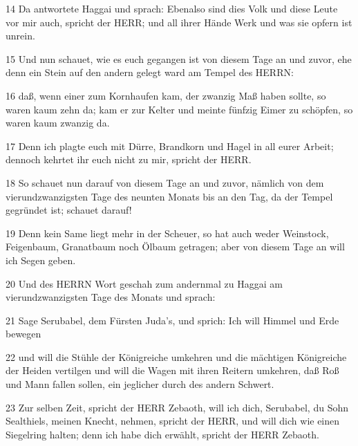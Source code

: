 \par 14 Da antwortete Haggai und sprach: Ebenalso sind dies Volk und diese Leute vor mir auch, spricht der HERR; und all ihrer Hände Werk und was sie opfern ist unrein.
\par 15 Und nun schauet, wie es euch gegangen ist von diesem Tage an und zuvor, ehe denn ein Stein auf den andern gelegt ward am Tempel des HERRN:
\par 16 daß, wenn einer zum Kornhaufen kam, der zwanzig Maß haben sollte, so waren kaum zehn da; kam er zur Kelter und meinte fünfzig Eimer zu schöpfen, so waren kaum zwanzig da.
\par 17 Denn ich plagte euch mit Dürre, Brandkorn und Hagel in all eurer Arbeit; dennoch kehrtet ihr euch nicht zu mir, spricht der HERR.
\par 18 So schauet nun darauf von diesem Tage an und zuvor, nämlich von dem vierundzwanzigsten Tage des neunten Monats bis an den Tag, da der Tempel gegründet ist; schauet darauf!
\par 19 Denn kein Same liegt mehr in der Scheuer, so hat auch weder Weinstock, Feigenbaum, Granatbaum noch Ölbaum getragen; aber von diesem Tage an will ich Segen geben.
\par 20 Und des HERRN Wort geschah zum andernmal zu Haggai am vierundzwanzigsten Tage des Monats und sprach:
\par 21 Sage Serubabel, dem Fürsten Juda's, und sprich: Ich will Himmel und Erde bewegen
\par 22 und will die Stühle der Königreiche umkehren und die mächtigen Königreiche der Heiden vertilgen und will die Wagen mit ihren Reitern umkehren, daß Roß und Mann fallen sollen, ein jeglicher durch des andern Schwert.
\par 23 Zur selben Zeit, spricht der HERR Zebaoth, will ich dich, Serubabel, du Sohn Sealthiels, meinen Knecht, nehmen, spricht der HERR, und will dich wie einen Siegelring halten; denn ich habe dich erwählt, spricht der HERR Zebaoth.

